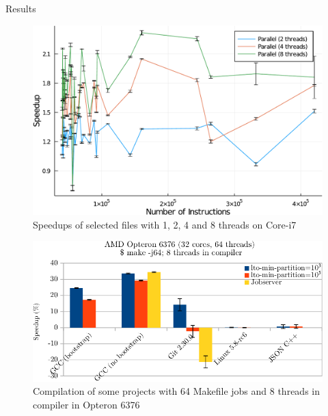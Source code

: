 \begin{subsection}{Results}
\begin{figure}
\includegraphics[scale=0.7]{figuras/times-speedup-crop.pdf}
\caption{Speedups of selected files with 1, 2, 4 and 8 threads on Core-i7}
\label{fig:gcc_all_files}
\end{figure}

\begin{figure}
\centering
	 \includegraphics[scale=1]{figuras/experiment_projects_new-crop.pdf}
	  \caption{Compilation of some projects with 64 Makefile jobs and 8 threads in compiler in Opteron 6376}
	  \label{fig:gcc_projects}
\end{figure}



\end{subsection}
